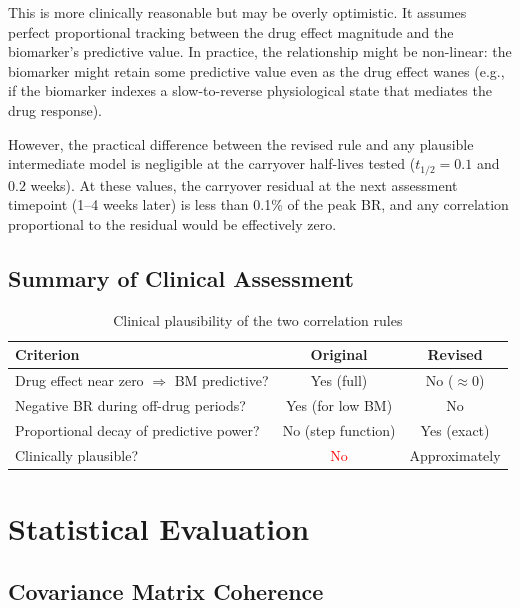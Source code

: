 \documentclass[11pt]{article}
\begin{document}
This is more clinically reasonable but may be overly
optimistic. It assumes perfect proportional tracking between
the drug effect magnitude and the biomarker's predictive
value. In practice, the relationship might be non-linear:
the biomarker might retain some predictive value even as
the drug effect wanes (e.g., if the biomarker indexes a
slow-to-reverse physiological state that mediates the drug
response).

However, the practical difference between the revised rule
and any plausible intermediate model is negligible at the
carryover half-lives tested ($t_{1/2} = 0.1$ and $0.2$
weeks). At these values, the carryover residual at the next
assessment timepoint (1--4 weeks later) is less than 0.1\%
of the peak BR, and any correlation proportional to the
residual would be effectively zero.

\subsection{Summary of Clinical Assessment}

\begin{table}[h]
\centering
\caption{Clinical plausibility of the two correlation rules}
\begin{tabular}{lcc}
\toprule
Criterion & Original & Revised \\
\midrule
Drug effect near zero $\Rightarrow$ BM predictive?
  & Yes (full) & No ($\approx 0$) \\
Negative BR during off-drug periods?
  & Yes (for low BM) & No \\
Proportional decay of predictive power?
  & No (step function) & Yes (exact) \\
Clinically plausible?
  & \textcolor{red}{No} & Approximately \\
\bottomrule
\end{tabular}
\end{table}

\section{Statistical Evaluation}

\subsection{Covariance Matrix Coherence}
\end{document}
